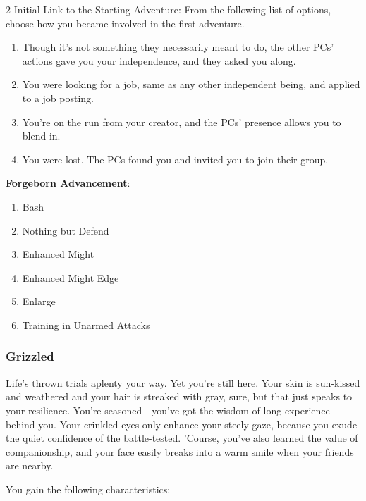 \begin{multicols}{2}
Initial Link to the Starting Adventure: From the following list of options, choose how you became involved in the first adventure. 
\begin{enumerate}
\item	Though it’s not something they necessarily meant to do, the other PCs’ actions gave you your independence, and they asked you along.
\item	You were looking for a job, same as any other independent being, and applied to a job posting. 
\item	You’re on the run from your creator, and the PCs’ presence allows you to blend in. 
\item	You were lost. The PCs found you and invited you to join their group. 
\end{enumerate}

\textbf{Forgeborn Advancement}: 

\begin{enumerate}
\item Bash
\item Nothing but Defend 
\item Enhanced Might
\item Enhanced Might Edge 
\item Enlarge 
\item Training in Unarmed Attacks
\end{enumerate}

\subsubsection{Grizzled}

Life’s thrown trials aplenty your way. Yet you’re still here. Your skin is sun-kissed and weathered and your hair is streaked with gray, sure, but that just speaks to your resilience. You’re seasoned—you’ve got the wisdom of long experience behind you. Your crinkled eyes only enhance your steely gaze, because you exude the quiet confidence of the battle-tested. ’Course, you’ve also learned the value of companionship, and your face easily breaks into a warm smile when your friends are nearby.

You gain the following characteristics: 


\end{multicols}
